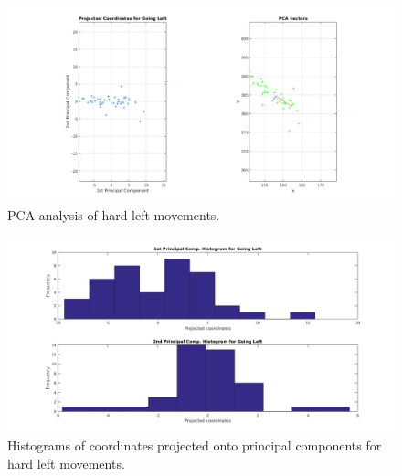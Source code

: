 \documentclass[paper=a4, fontsize=11pt]{scrartcl} %
\begin{document}
    \begin{figure}[h!]
        \begin{center}
            \setlength{\fboxsep}{0.5pt} %
            \setlength{\fboxrule}{0.5pt}
            \includegraphics[width=\linewidth,fbox]{images/pca_Left.png}
            \caption{PCA analysis of hard left movements.}
        \end{center}
    \end{figure}
    
    \begin{figure}[h!]
        \begin{center}
            \setlength{\fboxsep}{0.5pt} %
            \setlength{\fboxrule}{0.5pt}
            \includegraphics[width=\linewidth,fbox]{images/pca_histogram_Left.png}
            \caption{Histograms of coordinates projected onto principal components for hard left movements.}
        \end{center}
    \end{figure}
\end{document}

